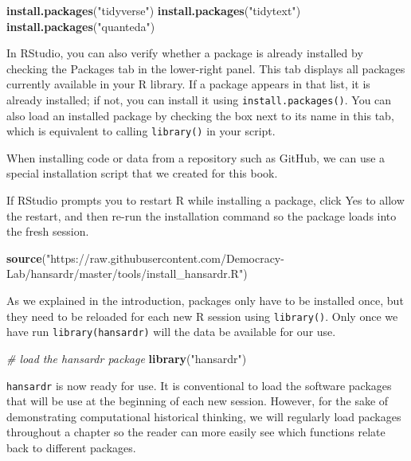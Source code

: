 \documentclass[
]{article}
\newenvironment{Shaded}{\begin{snugshade}}{\end{snugshade}}
\newcommand{\CommentTok}[1]{\textcolor[rgb]{0.56,0.35,0.01}{\textit{#1}}}
\newcommand{\FunctionTok}[1]{\textcolor[rgb]{0.13,0.29,0.53}{\textbf{#1}}}
\newcommand{\NormalTok}[1]{#1}
\newcommand{\StringTok}[1]{\textcolor[rgb]{0.31,0.60,0.02}{#1}}
\begin{document}
\begin{Shaded}
\begin{Highlighting}[]
\FunctionTok{install.packages}\NormalTok{(}\StringTok{"tidyverse"}\NormalTok{)}
\FunctionTok{install.packages}\NormalTok{(}\StringTok{"tidytext"}\NormalTok{)}
\FunctionTok{install.packages}\NormalTok{(}\StringTok{"quanteda"}\NormalTok{)}
\end{Highlighting}
\end{Shaded}

In RStudio, you can also verify whether a package is already installed
by checking the Packages tab in the lower-right panel. This tab displays
all packages currently available in your R library. If a package appears
in that list, it is already installed; if not, you can install it using
\texttt{install.packages()}. You can also load an installed package by
checking the box next to its name in this tab, which is equivalent to
calling \texttt{library()} in your script.

When installing code or data from a repository such as GitHub, we can
use a special installation script that we created for this book.

If RStudio prompts you to restart R while installing a package, click
Yes to allow the restart, and then re-run the installation command so
the package loads into the fresh session.

\begin{Shaded}
\begin{Highlighting}[]
\FunctionTok{source}\NormalTok{(}\StringTok{"https://raw.githubusercontent.com/Democracy{-}Lab/hansardr/master/tools/install\_hansardr.R"}\NormalTok{)}
\end{Highlighting}
\end{Shaded}

As we explained in the introduction, packages only have to be installed
once, but they need to be reloaded for each new R session using
\texttt{library()}. Only once we have run \texttt{library(hansardr)}
will the data be available for our use.

\begin{Shaded}
\begin{Highlighting}[]
\CommentTok{\# load the hansardr package}
\FunctionTok{library}\NormalTok{(}\StringTok{"hansardr"}\NormalTok{)}
\end{Highlighting}
\end{Shaded}

\texttt{hansardr} is now ready for use. It is conventional to load the
software packages that will be use at the beginning of each new session.
However, for the sake of demonstrating computational historical
thinking, we will regularly load packages throughout a chapter so the
reader can more easily see which functions relate back to different
packages.
\end{document}
